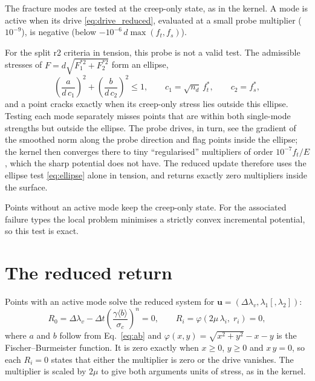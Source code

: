 \documentclass[11pt,a4paper]{article}
\begin{document}
The fracture modes are tested at the creep-only state, as in the kernel. A mode is active when its
drive \eqref{eq:drive_reduced}, evaluated at a small probe multiplier ($10^{-9}$), is negative
(below $-10^{-6}\,d\max(f_t,f_s)$).

For the split r2 criteria in tension, this probe is not a valid test. The admissible stresses of
$F=d\sqrt{F_1^{*2}+F_2^{*2}}$ form an ellipse,
\begin{equation}
  \left(\frac{a}{d\,c_1}\right)^2+\left(\frac{b}{d\,c_2}\right)^2\leq1,\qquad
  c_1=\sqrt{n_d}\,f_t^*,\qquad c_2=f_s^*,
  \label{eq:ellipse}
\end{equation}
and a point cracks exactly when its creep-only stress lies outside this ellipse. Testing each mode
separately misses points that are within both single-mode strengths but outside the ellipse.
The probe drives, in turn, see the gradient of the smoothed norm along the probe direction and
flag points inside the ellipse; the kernel then converges there to tiny ``regularised''
multipliers of order $10^{-7}f_t/E$, which the sharp potential does not have. The reduced update
therefore uses the ellipse test \eqref{eq:ellipse} alone in tension, and returns exactly zero
multipliers inside the surface.

Points without an active mode keep the creep-only state. For the associated failure types the
local problem minimises a strictly convex incremental potential, so this test is exact.

\section{The reduced return}
\label{sec:return}

Points with an active mode solve the reduced system for $\bm{u}=(\Delta\lambda_v,\lambda_1[,\lambda_2])$:
\begin{equation}
  R_0=\Delta\lambda_v-\Delta t\left(\frac{\gamma\langle b\rangle}{\sigma_c}\right)^n=0,\qquad
  R_i=\varphi\!\left(2\mu\,\lambda_i,\;r_i\right)=0,
  \label{eq:system}
\end{equation}
where $a$ and $b$ follow from Eq.~\eqref{eq:ab} and $\varphi(x,y)=\sqrt{x^2+y^2}-x-y$ is the
Fischer--Burmeister function. It is zero exactly when $x\geq0$, $y\geq0$ and $x\,y=0$, so each
$R_i=0$ states that either the multiplier is zero or the drive vanishes. The multiplier is scaled
by $2\mu$ to give both arguments units of stress, as in the kernel.
\end{document}
